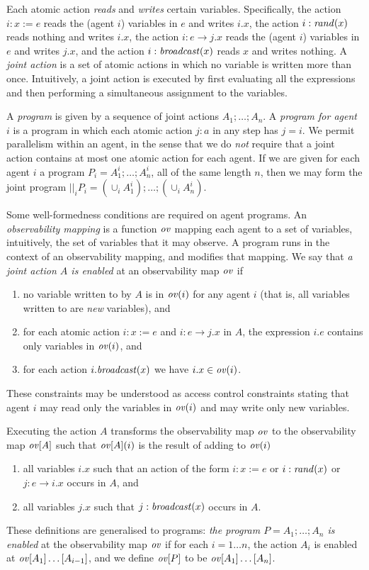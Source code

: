 \documentclass[]{llncs}
\newcommand{\be}{\begin{enumerate}}
\newcommand{\ee}{\end{enumerate}}
\newcommand{\rand}{{\it rand}}
\newcommand{\broadcast}{{\it broadcast}}
\newcommand{\omap}{{\it ov}}
\begin{document}
 Each atomic action {\em reads}  and {\em writes}  certain variables. 
 Specifically, the action $i: x:=e$  reads the (agent $i$) variables in $e$ and writes $i.x$, the action 
$i: \rand(x)$ reads nothing and writes $i.x$, the action 
$i: e \rightarrow j.x$ reads the (agent $i$) variables in $e$ and writes $j.x$, and the action 
$i: \broadcast(x)$ reads $x$  and writes nothing. 
A {\em  joint action} is  a set of atomic actions in which no variable is 
written more than once.   Intuitively,  a joint action is executed by first evaluating all the expressions and then performing a  simultaneous
assignment  to the variables. 

A {\em program}  is given by a sequence of joint actions
$A_1; \ldots; A_n$. 
A {\em program for agent $i$} is a program in which  each atomic action $j:a$ in any step 
has $j=i$. We permit parallelism within an agent, in the sense that we do {\em not} require that 
a joint action contains at most one atomic action for each agent. 
If we are given for each agent $i$ a program $P_i= A^i_1; \ldots; A^i_n$, all of the same
length $n$, then we may form the joint program $||_i P_i = (\cup_i A^i_1); \ldots ; (\cup_i A^i_n)$. 

Some well-formedness conditions are required on agent programs. 
An {\em observability mapping} is a function $\omap$  mapping each agent 
to a set of variables, intuitively, the set of variables that it may observe. 
A program runs in the context of an observability mapping, and modifies that 
mapping. We say that {\em a joint action $A$ is  enabled} at an observability 
map $\omap$ if 
\be 
\item no variable written to by $A$ is in  $\omap(i)$ for any agent $i$
(that is, all variables written to are 
{\em new} variables), and 
\item for each atomic action $i: x:=e$ and $i: e \rightarrow j.x$ in $A$, 
the expression $i.e$ contains only variables in $\omap(i)$, and 
\item for each action $i.\broadcast(x)$ we have $i.x\in \omap(i)$. 
\ee 
These constraints may be understood as access control constraints stating that 
agent $i$ may read only the variables in $\omap(i)$ and may write only new variables. 

Executing the action $A$ transforms the  observability map $\omap$
to the  observability map $\omap [A]$  
such that $\omap[A](i)$ is  the result of adding to $\omap(i)$
\be 
\item 
all variables $i.x$  such that an action of the form $i: x:= e$ or $i:\rand(x)$ or  $j: e\rightarrow i.x$ occurs in $A$, and 
\item 
all variables $j.x$   such that $j:\broadcast(x)$ 
occurs in $A$. 
\ee 
These definitions are  generalised to programs: 
{\em the program $P = A_1; \ldots; A_n$  is enabled}  at
the observability map $\omap$  if for each $i = 1 \ldots n$, 
the action $A_i$ is  enabled at $\omap [A_1]\ldots [A_{i-1}]$, 
and we define $\omap [P]$ to be $\omap [A_1]\ldots [A_n]$. 
\end{document}

